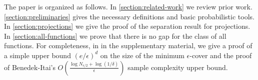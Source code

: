 The paper is organized as follows. In \autoref{section:related-work} we review
prior work. \autoref{section:preliminaries} gives the necessary definitions and
basic probabilistic tools. In \autoref{section:projections} we give the proof of
the separation result for projections. In \autoref{section:all-functions} we
prove that there is no gap for the class of all functions. For completeness, in
in the supplementary material, we give a proof of a simple upper bound
$(e/\epsilon)^d$ on the size of the minimum $\epsilon$-cover and the proof of
Benedek-Itai's $O \left( \frac{\log N_{\epsilon/2} + \log
(1/\delta)}{\epsilon}\right)$ sample complexity upper bound.
